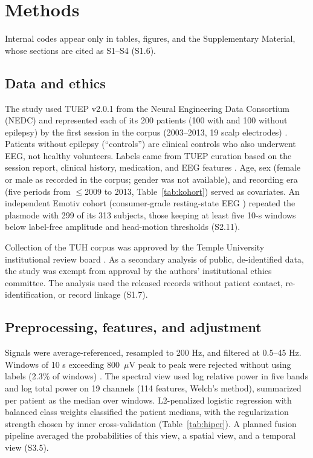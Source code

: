 \documentclass[final,1p,times]{elsarticle}
\begin{document}
\section{Methods}\label{sec:methods}

Internal codes appear only in tables, figures, and the Supplementary Material, whose sections are cited as S1--S4 (S1.6).

\subsection{Data and ethics}\label{sec:desain}

The study used TUEP v2.0.1 from the Neural Engineering Data Consortium (NEDC) and represented each of its 200 patients (100 with and 100 without epilepsy) by the first session in the corpus (2003--2013, 19 scalp electrodes) \cite{veloso2017,obeid2016}. Patients without epilepsy (``controls'') are clinical controls who also underwent EEG, not healthy volunteers. Labels came from TUEP curation based on the session report, clinical history, medication, and EEG features \cite{veloso2017}. Age, sex (female or male as recorded in the corpus; gender was not available), and recording era (five periods from $\leq$2009 to 2013, Table~\ref{tab:kohort}) served as covariates. An independent Emotiv cohort (consumer-grade resting-state EEG \cite{vanhees2018}) repeated the plasmode with 299 of its 313 subjects, those keeping at least five 10-s windows below label-free amplitude and head-motion thresholds (S2.11).

Collection of the TUH corpus was approved by the Temple University institutional review board \cite{obeid2016}. As a secondary analysis of public, de-identified data, the study was exempt from approval by the authors' institutional ethics committee. The analysis used the released records without patient contact, re-identification, or record linkage (S1.7).

\subsection{Preprocessing, features, and adjustment}\label{sec:praproses}

Signals were average-referenced, resampled to 200 Hz, and filtered at 0.5--45 Hz. Windows of 10 s exceeding 800~$\mu$V peak to peak were rejected without using labels (2.3\% of windows) \cite{gemein2020,kiessner2024,poziomska2026}. The spectral view used log relative power in five bands and log total power on 19 channels (114 features, Welch's method), summarized per patient as the median over windows. L2-penalized logistic regression with balanced class weights classified the patient medians, with the regularization strength chosen by inner cross-validation (Table~\ref{tab:hiper}). A planned fusion pipeline averaged the probabilities of this view, a spatial view, and a temporal view (S3.5).
\end{document}
